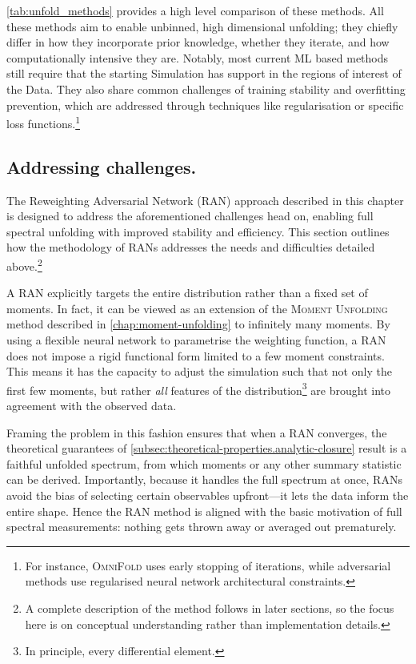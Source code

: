 {{        \cref{tab:unfold_methods} provides a high level comparison of these methods.
        All these methods aim to enable unbinned, high dimensional unfolding; they chiefly differ in how they incorporate prior knowledge, whether they iterate, and how computationally intensive they are.
        Notably, most current ML based methods still require that the starting Simulation has support in the regions of interest of the Data.
        They also share common challenges of training stability and overfitting prevention, which are addressed through techniques like regularisation or specific loss functions.\footnote{For instance, \textsc{OmniFold} uses early stopping of iterations, while adversarial methods use regularised neural network architectural constraints.}

        

    \subsection{Addressing challenges.}
    
        The Reweighting Adversarial Network (RAN) approach described in this chapter is designed to address the aforementioned challenges head on, enabling full spectral unfolding with improved stability and efficiency.
        This section outlines how the methodology of RANs addresses the needs and difficulties detailed above.\footnote{A complete description of the method follows in later sections, so the focus here is on conceptual understanding rather than implementation details.}
        
        A RAN explicitly targets the entire distribution rather than a fixed set of moments.
        In fact, it can be viewed as an extension of the \textsc{Moment Unfolding} method described in \cref{chap:moment-unfolding} to infinitely many moments.
        By using a flexible neural network to parametrise the weighting function, a RAN does not impose a rigid functional form limited to a few moment constraints.
        This means it has the capacity to adjust the simulation such that not only the first few moments, but rather \emph{all} features of the distribution\footnote{In principle, every differential element.} are brought into agreement with the observed data.
        
        Framing the problem in this fashion ensures that when a RAN converges, the theoretical guarantees of \cref{subsec:theoretical-properties.analytic-closure} result is a faithful unfolded spectrum, from which moments or any other summary statistic can be derived.
        Importantly, because it handles the full spectrum at once, RANs avoid the bias of selecting certain observables upfront---it lets the data inform the entire shape. 
        Hence the RAN method is aligned with the basic motivation of full spectral measurements: nothing gets thrown away or averaged out prematurely.

}}

